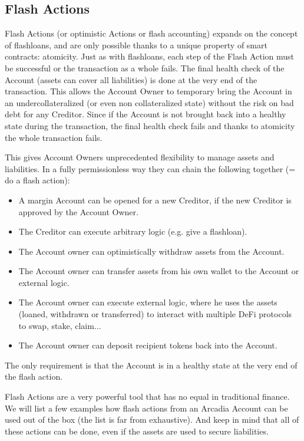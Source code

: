\documentclass[sigconf,nonacm]{acmart}
\begin{document}
\subsection{Flash Actions}
Flash Actions (or optimistic Actions or flash accounting) expands on the concept of flashloans, and are only possible thanks to a unique property of smart contracts: atomicity\cite{xie2022towards}.
Just as with flashloans, each step of the Flash Action must be successful or the transaction as a whole fails.
The final health check of the Account (assets can cover all liabilities) is done at the very end of the transaction.
This allows the Account Owner to temporary bring the Account in an undercollateralized (or even non collateralized state) without the risk on bad debt for any Creditor.
Since if the Account is not brought back into a healthy state during the transaction, the final health check fails and thanks to atomicity the whole transaction fails.

This gives Account Owners unprecedented flexibility to manage assets and liabilities.
In a fully permissionless way they can chain the following together (= do a flash action):
\begin{itemize}
    \item A margin Account can be opened for a new Creditor, if the new Creditor is approved by the Account Owner.
    \item The Creditor can execute arbitrary logic (e.g. give a flashloan).
    \item The Account owner can optimistically withdraw assets from the Account.
    \item The Account owner can transfer assets from his own wallet to the Account or external logic.
    \item The Account owner can execute external logic, where he uses the assets (loaned, withdrawn or transferred) to interact with multiple DeFi protocols to swap, stake, claim...
    \item The Account owner can deposit recipient tokens back into the Account.
\end{itemize}
The only requirement is that the Account is in a healthy state at the very end of the flash action.

Flash Actions are a very powerful tool that has no equal in traditional finance.
We will list a few examples how flash actions from an Arcadia Account can be used out of the box (the list is far from exhaustive).
And keep in mind that all of these actions can be done, even if the assets are used to secure liabilities.
\end{document}
